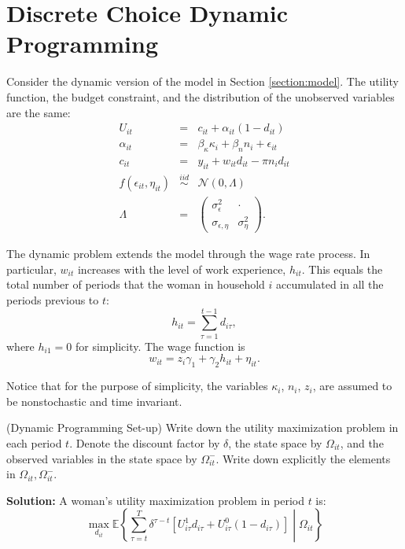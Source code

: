 \section{Discrete Choice Dynamic Programming}
Consider the dynamic version of the model in Section \ref{section:model}. The utility function, the budget constraint, and the distribution of the unobserved variables are the same:
\begin{eqnarray*}
U_{it} &=& c_{it} + \alpha_{it} (1 - d_{it})\\
\alpha_{it} &=& \beta_{\kappa} \kappa_{i} + \beta_{n} n_{i} + \epsilon_{it}\\
c_{it} &=& y_{it} + w_{it} d_{it} - \pi n_{i} d_{it}\\
f \left( \epsilon_{it}, \eta_{it} \right) & \overset{iid}{\sim} & \mathcal{N} \left( 0, \Lambda \right)\\
\Lambda &=& \left( \begin{array}{cc} 
\sigma_{\epsilon}^2 & \cdot \\
\sigma_{\epsilon, \eta} & \sigma_{\eta}^2
\end{array} \right).
\end{eqnarray*}

\indent The dynamic problem extends the model through the wage rate process. In particular, $w_{it}$ increases with the level of work experience, $h_{it}$. This equals the total number of periods that the woman in household $i$ accumulated in all the periods previous to $t$:
\begin{equation*}
h_{it} = \sum\limits_{\tau=1}^{t-1} d_{i\tau},
\end{equation*} 
\noindent where $h_{i1} = 0$ for simplicity. The wage function is
\begin{equation*}
w_{it} = z_{i}\gamma_{1} + \gamma_{2}h_{it} + \eta_{it}.
\end{equation*} 

\noindent Notice that for the purpose of simplicity, the variables $\kappa_i$, $n_i$, $z_i$, are assumed to be nonstochastic and time invariant.

\begin{exercise} (Dynamic Programming Set-up)
Write down the utility maximization problem in each period $t$. Denote the discount factor by  $\delta$, the state space by $\Omega_{it}$, and the observed variables in the state space by $\Omega_{it}^-$. Write down explicitly the elements in $\Omega_{it},\Omega_{it}^-$.
\end{exercise}

\noindent\textbf{Solution:}	
\noindent A woman's utility maximization problem in period $t$ is:
\begin{equation*}
\max_{d_{it}} \mathbb{E}\left\{ \sum\limits_{\tau=t}^{T}\delta^{\tau-t} \left[U^{1}_{i\tau}d_{i\tau} + U^{0}_{i\tau}\left( 1-d_{i\tau} \right)\right] \middle| \Omega_{it}\right\} 
\end{equation*}

